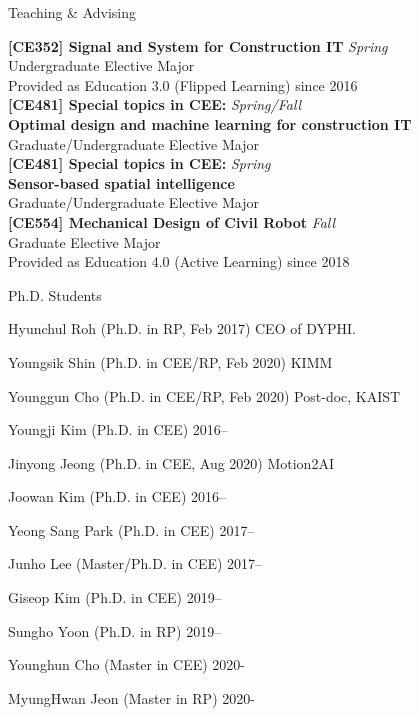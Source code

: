 \begin{rSection}{Teaching \& Advising}

{\bf[CE352] Signal and System for Construction IT} \hfill {\em Spring} \\
Undergraduate Elective Major \\
Provided as Education 3.0 (Flipped Learning) since 2016\\

{\bf[CE481] Special topics in CEE:} \hfill {\em Spring/Fall} \\
{\bf Optimal design and machine learning for construction IT}\\
Graduate/Undergraduate Elective Major \\

{\bf[CE481] Special topics in CEE:} \hfill {\em Spring} \\
{\bf Sensor-based spatial intelligence}\\
Graduate/Undergraduate Elective Major \\

{\bf[CE554] Mechanical Design of Civil Robot } \hfill {\em Fall} \\
Graduate Elective Major \\
Provided as Education 4.0 (Active Learning) since 2018\\

\begin{rSubsection}{Ph.D. Students}{}{}{}
  \item Hyunchul Roh (Ph.D. in \acf{RP}, Feb 2017) \hfill CEO of DYPHI.
  \item Youngsik Shin (Ph.D. in \ac{CEE}/\ac{RP}, Feb 2020) \hfill KIMM
  \item Younggun Cho (Ph.D. in \ac{CEE}/\ac{RP}, Feb 2020) \hfill Post-doc, KAIST
  \item Youngji Kim (Ph.D. in \ac{CEE}) \hfill 2016--
  \item Jinyong Jeong (Ph.D. in \ac{CEE}, Aug 2020) \hfill Motion2AI
  \item Joowan Kim (Ph.D. in \ac{CEE}) \hfill 2016--
  \item Yeong Sang Park (Ph.D. in \ac{CEE}) \hfill 2017--
  \item Junho Lee (Master/Ph.D. in \ac{CEE}) \hfill 2017--
  \item Giseop Kim (Ph.D. in \ac{CEE}) \hfill 2019--
  \item Sungho Yoon (Ph.D. in \ac{RP}) \hfill 2019--
  \item Younghun Cho (Master in \ac{CEE}) \hfill 2020-
  \item MyungHwan Jeon (Master in \ac{RP}) \hfill 2020-
\end{rSubsection}


\end{rSection}
